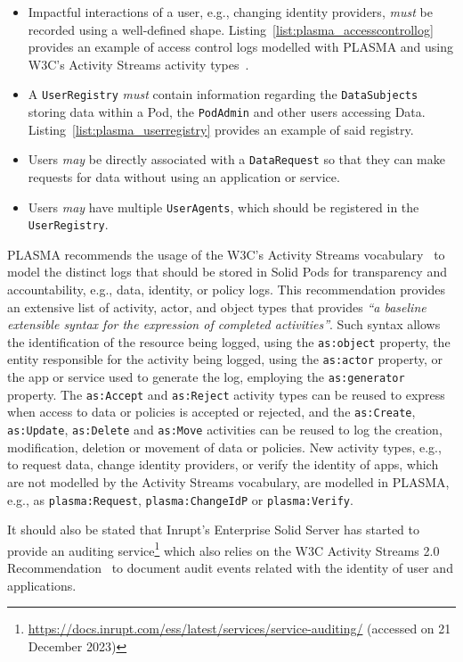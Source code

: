 \begin{itemize}
    \item Impactful interactions of a user, e.g., changing identity providers, \textit{must} be recorded using a well-defined shape. Listing~\ref{list:plasma_accesscontrollog} provides an example of access control logs modelled with PLASMA and using W3C's Activity Streams activity types~\citep{snell_activity_2017}.
    \item A \texttt{UserRegistry} \textit{must} contain information regarding the \texttt{DataSubjects} storing data within a Pod, the \texttt{PodAdmin} and other users accessing Data. Listing~\ref{list:plasma_userregistry} provides an example of said registry.
    \item Users \textit{may} be directly associated with a \texttt{DataRequest} so that they can make requests for data without using an application or service.
    \item Users \textit{may} have multiple \texttt{UserAgents}, which should be registered in the \texttt{UserRegistry}.
\end{itemize}

PLASMA recommends the usage of the W3C's Activity Streams vocabulary~\citep{snell_activity_2017} to model the distinct logs that should be stored in Solid Pods for transparency and accountability, e.g., data, identity, or policy logs.
This recommendation provides an extensive list of activity, actor, and object types that provides \textit{``a baseline extensible syntax for the expression of completed activities''}.
Such syntax allows the identification of the resource being logged, using the \texttt{as:object} property, the entity responsible for the activity being logged, using the \texttt{as:actor} property, or the app or service used to generate the log, employing the \texttt{as:generator} property.
The \texttt{as:Accept} and \texttt{as:Reject} activity types can be reused to express when access to data or policies is accepted or rejected, and the \texttt{as:Create}, \texttt{as:Update}, \texttt{as:Delete} and \texttt{as:Move} activities can be reused to log the creation, modification, deletion or movement of data or policies.
New activity types, e.g., to request data, change identity providers, or verify the identity of apps, which are not modelled by the Activity Streams vocabulary, are modelled in PLASMA, e.g., as \texttt{plasma:Request}, \texttt{plasma:ChangeIdP} or \texttt{plasma:Verify}.

It should also be stated that Inrupt's Enterprise Solid Server has started to provide an auditing service\footnote{\url{https://docs.inrupt.com/ess/latest/services/service-auditing/} (accessed on 21 December 2023)} which also relies on the W3C Activity Streams 2.0 Recommendation~\citep{snell_activity_2017} to document audit events related with the identity of user and applications.

